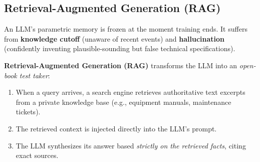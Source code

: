 \subsection{Retrieval-Augmented Generation (RAG)}\label{subsec:rag}

\begin{keyidea}
An LLM's parametric memory is frozen at the moment training ends. It suffers from \textbf{knowledge cutoff} (unaware of recent events) and \textbf{hallucination} (confidently inventing plausible-sounding but false technical specifications).

\textbf{Retrieval-Augmented Generation (RAG)} transforms the LLM into an \emph{open-book test taker}:
\begin{enumerate}
    \item When a query arrives, a search engine retrieves authoritative text excerpts from a private knowledge base (e.g., equipment manuals, maintenance tickets).
    \item The retrieved context is injected directly into the LLM's prompt.
    \item The LLM synthesizes its answer based \emph{strictly on the retrieved facts}, citing exact sources.
\end{enumerate}
\end{keyidea}

